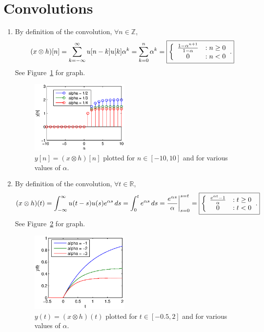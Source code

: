 \documentclass[11pt]{article}
\newcommand{\Z}{\mathbb{Z}} %
\newcommand{\R}{\mathbb{R}} %
\begin{document}
\section{Convolutions}
\begin{enumerate}
\item By definition of the convolution, $\forall n \in \Z$,
\[
  (x \otimes h)[n]
 = \sum_{k = -\infty}^{\infty} u[n - k] u[k] \alpha^k
 = \sum_{k = 0}^{n} \alpha^k
 = \mbox{\fbox{$\displaystyle
        \left\{
            \begin{array}{cl}
                \frac{1 - \alpha^{n + 1}}{1 - \alpha} & : n \geq 0 \\
                0                                     & : n < 0
            \end{array}
        \right.
$.}}
\]
See Figure~\ref{fig:2.1} for graph.
\begin{figure}[h]
\begin{center}
\includegraphics[width=0.46\textwidth]{2.1.eps}
\end{center}
\caption{$y[n] = (x \otimes h)[n]$ plotted for $n \in [-10,10]$ and for various
values of $\alpha$.}
\label{fig:2.1}
\end{figure}

\item By definition of the convolution, $\forall t \in \R$,
\[
  (x \otimes h)(t)
 = \int_{-\infty}^{\infty} u(t - s)u(s)e^{\alpha s} \, ds
 = \int_0^t e^{\alpha s} \, ds
 = \frac{e^{\alpha s}}{\alpha} \bigg|_{s = 0}^{s = t}
 = \mbox{\fbox{$\displaystyle
        \left\{
            \begin{array}{cl}
                \frac{e^{\alpha t} - 1}{\alpha} & : t \geq 0 \\
                0                               & : t < 0
            \end{array}
        \right.
$.}}
\]
See Figure~\ref{fig:2.2} for graph.
\begin{figure}[h]
\begin{center}
\includegraphics[width=0.46\textwidth]{2.2.eps}
\end{center}
\caption{$y(t) = (x \otimes h)(t)$ plotted for $t \in [-0.5,2]$ and for various
values of $\alpha$.}
\label{fig:2.2}
\end{figure}
 

\end{enumerate}
\end{document}
